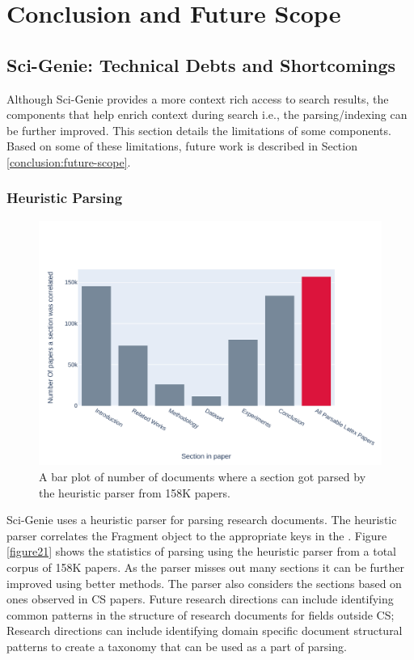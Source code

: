 \chapter{Conclusion and Future Scope}
\label{conclusion}

\section{Sci-Genie: Technical Debts and Shortcomings}
Although Sci-Genie provides a more context rich access to search results, the components that help enrich context during search i.e., the parsing/indexing can be further improved. This section details the limitations of some components. Based on some of these limitations, future work is described in Section \ref{conclusion:future-scope}.

\subsection{Heuristic Parsing}
\begin{figure}[h]
    \centering
    \includegraphics[width=\maxwidth{\textwidth}]{src/images/parsing-stats.pdf}
    \caption{ A bar plot of number of documents where a section got parsed by the heuristic parser from 158K papers. }
    \label{figure\arabic{figurecounter}}
\end{figure}
Sci-Genie uses a heuristic parser for parsing research documents. The heuristic parser correlates the Fragment object to the appropriate keys in the . Figure \ref{figure21} shows the statistics of parsing using the heuristic parser from a total corpus of 158K papers. As the parser misses out many sections it can be further improved using better methods. The parser also considers the sections based on ones observed in CS papers. Future research directions can include identifying common patterns in the structure of research documents for fields outside CS; Research directions can include identifying domain specific document structural patterns to create a taxonomy that can be used as a part of parsing.


